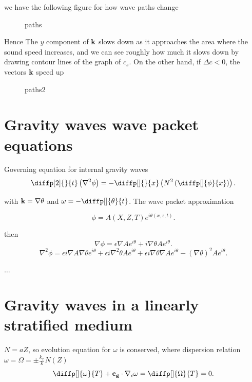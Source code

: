 we have the following figure for how wave paths change

\graphicspath{{/home/ucsc/current-course/figures/}}
\begin{figure}[H]
    \centering
    \caption{paths}
    \label{fig:paths}
\end{figure}

Hence The $y$ component of ${\bf k}$ slows down as it approaches the area where
the sound speed increases, and we can see roughly how much it slows down by
drawing contour lines of the graph of $c_{s}$. On the other hand, if $\Delta
c <0$, the vectors ${\bf k}$ speed up

\begin{figure}[H]
    \centering
    \caption{paths2}
    \label{fig:paths2}
\end{figure}

\section{Gravity waves wave packet equations}%
\label{sec:gravity_waves_wave_packet_equations}

Governing equation for internal gravity waves
\[
\diffp[2]{}{t} \left( \nabla ^2 \phi \right) = - \diffp[]{}{x} \left( N^2
\left( \diffp[]{\phi}{x}\right)\right)
.\] 

with ${\bf k} = \nabla \theta $ and $ \omega = - \diffp[]{\theta }{t}$. The
wave packet approximation

\[
  \phi = A(X,Z,T) e^{i \theta (x,z,t)}
.\] 

then
\[
\nabla \phi = \epsilon \nabla Ae^{i \theta } + i \nabla \theta Ae^{i \theta }
.\] 
\[
\nabla ^2\phi = \epsilon i \nabla A \nabla \theta e^{i \theta } + \epsilon
i \nabla ^2 \theta Ae^{i \theta } +  \epsilon i \nabla \theta \nabla A e^{i
\theta } - (\nabla \theta )^2 A e^{i \theta }
.\] 

$\dots$

\section{Gravity waves in a linearly stratified medium}%
\label{sec:gravity_waves_in_a_linearly_stratified_medium}

$N = aZ$, so evolution equation for $\omega $ is conserved, where dispersion
relation $\omega = \Omega = \pm \frac{k_{x}}{k}N(Z)$
\[
  \diffp[]{\omega }{T} + {\bf c_{g}}\cdot \nabla _{\epsilon
  } \omega = \diffp[]{\Omega}{T} = 0
.\] 

